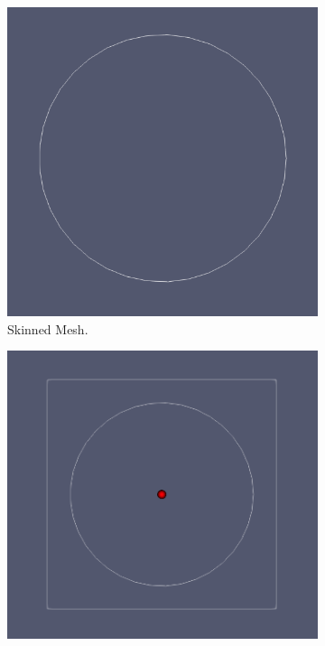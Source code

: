 \documentclass[12pt, letterpaper]{article}
\begin{document}
\begin{figure}[ht]
\begin{subfigure}{0.4\textwidth}
	    \includegraphics[width=\linewidth]{	processExample/skin.png}
	    \caption{Skinned Mesh.}
	\end{subfigure}
	\vspace*{\fill}	
	\begin{subfigure}{0.4\textwidth}
	    \includegraphics[width=\linewidth]{	processExample/bound.png}

\end{subfigure}
\end{figure}
\end{document}
